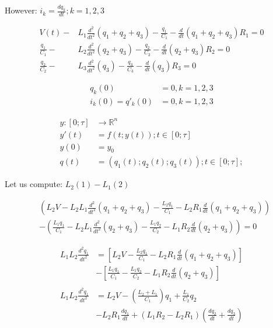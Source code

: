 \documentclass[12pt]{article}
\begin{document}
However: $i_k = \frac{dq_k}{dt} ; k=1,2,3$



\begin{align}
	V(t)-&L_1 \frac{d^2}{dt^2}(q_1 + q_2 + q_3)-\frac{q_1}{C_1} -\frac{d}{dt}(q_1 + q_2 + q_3)R_1=0\\ 
	\frac{q_1}{C_1}-&L_2 \frac{d^2}{dt^2}(q_2+q_3)-\frac{q_2}{C_2} -\frac{d}{dt}(q_2+q_3)R_2=0 \label{2} \\ 
	\frac{q_2}{C_2}-&L_3 \frac{d^2}{dt^2}(q_3)-\frac{q_3}{C_3} -\frac{d}{dt}(q_3)R_3=0 \label{3}	
\end{align}

\begin{center}

	\begin{align*}
	q_k(0)&=0, k=1,2,3\\
	i_k(0)=q'_k(0)&=0, k=1,2,3
	\end{align*}

\end{center}

\newpage

\begin{align*}
	y:\left[0;\tau \right]&\rightarrow \mathbb{R}^n\\
	y'(t)&=f\left(t;y(t)\right) ; t\in \left[0;\tau \right]\\
	y(0)&=y_0\\
	q(t)&=(q_1(t);q_2(t);q_3(t)) ; t\in \left[0;\tau \right];
\end{align*}





Let us compute: $L_2(1)-L_1(2)$

\begin{align*}
	&\left( L_2 V-L_2 L_1 \frac{d^2}{dt^2}(q_1+q_2+q_3)-\frac{L_2 q_1}{C_1}-L_2 R_1\frac{d}{dt}(q_1+q_2+q_3)\right)\\ 
	&-\left( \frac{L_1 q_1}{C_1} -L_2 L_1 \frac{d^2}{dt^2}(q_2+q_3)-\frac{L_1 q_2}{C_2} -L_1 R_2 \frac{d}{dt}(q_2+q_3)\right)=0
\end{align*}



\begin{align*}
	L_1 L_2 \frac{d^2 q_1}{dt^2}&=\left[ L_2 V -\frac{L_2 q_1}{C_1}-L_2 R_1 \frac{d}{dt}(q_1+q_2+q_3)\right]\\
	&-\left[\frac{L_1 q_1}{C_1}-\frac{L_1 q_2}{C_2}-L_1 R_2 \frac{d}{dt}(q_2+q_3)\right]\\
	\\    
	L_1 L_2 \frac{d^2 q_1}{dt^2}&=L_2 V -\left(\frac{L_2+L_1}{C_1}\right)q_1+\frac{L_1}{C_2}q_2\\
	&-L_2 R_1\frac{dq_1}{dt}+(L_1 R_2-L_2 R_1)\left(\frac{dq_2}{dt}+\frac{dq_3}{dt}\right)
\end{align*}
\end{document}
